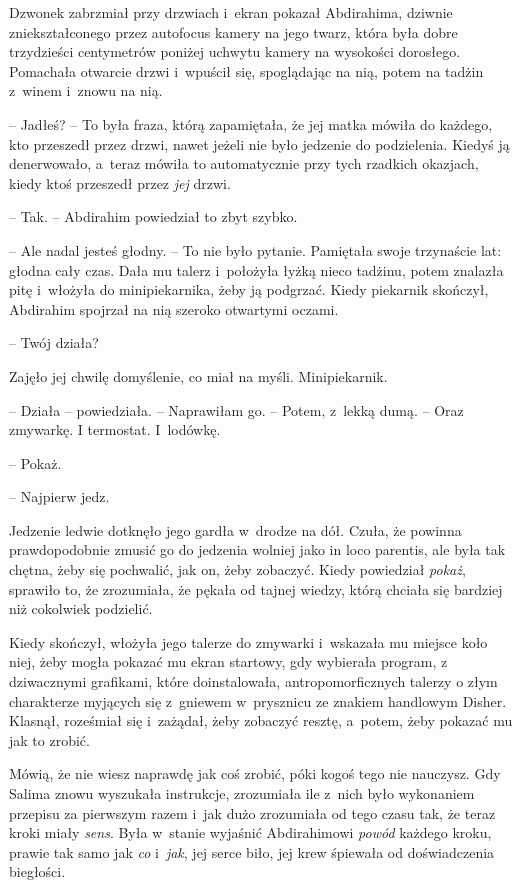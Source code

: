 \documentclass[oneside,polish,11pt,sfheadings]{mwbk}
\begin{document}
Dzwonek zabrzmiał przy drzwiach i~ekran pokazał Abdirahima, dziwnie
zniekształconego przez autofocus kamery na jego twarz, która była dobre
trzydzieści centymetrów poniżej uchwytu kamery na wysokości dorosłego.
Pomachała otwarcie drzwi i~wpuścił się, spoglądając na nią, potem na
tadżin z~winem i~znowu na nią.

-- Jadłeś? -- To była fraza, którą zapamiętała, że jej matka mówiła do
każdego, kto przeszedł przez drzwi, nawet jeżeli nie było jedzenie do
podzielenia. Kiedyś ją denerwowało, a~teraz mówiła to automatycznie przy
tych rzadkich okazjach, kiedy ktoś przeszedł przez \textit{jej} drzwi.

-- Tak. -- Abdirahim powiedział to zbyt szybko.

-- Ale nadal jesteś głodny. -- To nie było pytanie. Pamiętała swoje
trzynaście lat: głodna cały czas. Dała mu talerz i~położyła łyżką nieco
tadżinu, potem znalazła pitę i~włożyła do minipiekarnika, żeby ją
podgrzać. Kiedy piekarnik skończył, Abdirahim spojrzał na nią szeroko
otwartymi oczami.

-- Twój działa?

Zajęło jej chwilę domyślenie, co miał na myśli. Minipiekarnik. 

-- Działa
-- powiedziała. -- Naprawiłam go. -- Potem, z~lekką dumą. -- Oraz zmywarkę.
I termostat. I~lodówkę.

-- Pokaż.

-- Najpierw jedz.

Jedzenie ledwie dotknęło jego gardła w~drodze na dół. Czuła, że powinna
prawdopodobnie zmusić go do jedzenia wolniej jako in loco parentis, ale
była tak chętna, żeby się pochwalić, jak on, żeby zobaczyć. Kiedy
powiedział \textit{pokaż}, sprawiło to, że zrozumiała, że pękała od tajnej
wiedzy, którą chciała się bardziej niż cokolwiek podzielić.

Kiedy skończył, włożyła jego talerze do zmywarki i~wskazała mu miejsce
koło niej, żeby mogła pokazać mu ekran startowy, gdy wybierała program,
z dziwacznymi grafikami, które doinstalowała, antropomorficznych talerzy
o złym charakterze myjących się z~gniewem w~prysznicu ze znakiem
handlowym Disher. Klasnął, roześmiał się i~zażądał, żeby zobaczyć
resztę, a~potem, żeby pokazać mu jak to zrobić.

Mówią, że nie wiesz naprawdę jak coś zrobić, póki kogoś tego nie
nauczysz. Gdy Salima znowu wyszukała instrukcje, zrozumiała ile z~nich
było wykonaniem przepisu za pierwszym razem i~jak dużo zrozumiała od
tego czasu tak, że teraz kroki miały \textit{sens}. Była w~stanie wyjaśnić
Abdirahimowi \textit{powód} każdego kroku, prawie tak samo jak \textit{co} i~\textit{jak}, jej serce biło, jej krew śpiewała od doświadczenia
biegłości.
\end{document}
